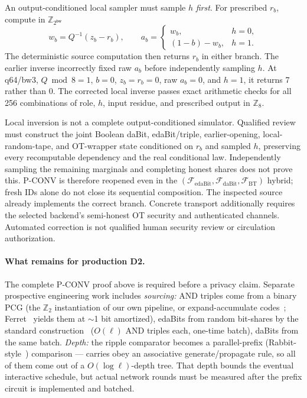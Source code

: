 \documentclass[11pt]{article}
\newcommand{\Z}{\mathbb{Z}}
\newcommand{\bw}{\mathsf{bw}}
\newcommand{\Q}{Q}   %
\begin{document}
An output-conditioned local sampler must sample $h$ \emph{first}.
For prescribed $r_b$, compute in $\Z_{2^\bw}$
\[
 w_b=\Q^{-1}(z_b-r_b),\qquad
 a_b=\begin{cases}
 w_b,&h=0,\\
 (1-b)-w_b,&h=1.
 \end{cases}
\]
The deterministic source computation then returns $r_b$ in either branch.
The earlier inverse incorrectly fixed raw $a_b$ before independently
sampling $h$. At q64/bw3, $\Q\bmod8=1$, $b=0$, $z_b=r_b=0$, raw
$a_b=0$, and $h=1$, it returns 7 rather than 0. The corrected local inverse
passes exact arithmetic checks for all 256 combinations of role, $h$,
input residue, and prescribed output in $\Z_8$.

Local inversion is not a complete output-conditioned simulator. Qualified
review must construct the joint Boolean daBit, edaBit/triple, earlier-opening,
local-random-tape, and OT-wrapper state conditioned on $r_b$ and sampled $h$,
preserving every recomputable dependency and the real conditional law.
Independently sampling the remaining marginals and completing honest shares
does not prove this. P-CONV is therefore reopened even in the
$(\mathcal F_{\mathrm{edaBit}},\mathcal F_{\mathrm{daBit}},
\mathcal F_{\mathrm{BT}})$ hybrid; fresh IDs alone do not close its sequential
composition. The inspected source already implements the correct branch.
Concrete transport additionally requires the selected backend's semi-honest
OT security and authenticated channels. Automated correction is not qualified
human security review or circulation authorization.

\paragraph{What remains for production D2.} The complete P-CONV proof above
is required before a privacy claim. Separate prospective engineering work
includes \emph{sourcing:} AND triples come
from a binary PCG (the $\Z_2$ instantiation of our own pipeline, or
expand-accumulate codes~\cite{couteau2021silver}; Ferret~\cite{yang2020ferret}
yields them at $\sim$1 bit amortized), edaBits from random bit-shares by the
standard construction~\cite{escudero2020edabits} ($O(\ell)$ AND triples each,
one-time batch), daBits from the same batch. \emph{Depth:} the ripple
comparator becomes a parallel-prefix (Rabbit-style~\cite{makri2021rabbit})
comparison --- carries obey an associative generate/propagate rule, so all of
them come out of a $O(\log\ell)$-depth tree. That depth bounds the eventual
interactive schedule, but actual network rounds must be measured after the
prefix circuit is implemented and batched.
\end{document}
